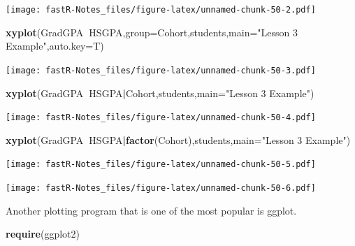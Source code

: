 \documentclass[]{book}
\newenvironment{Shaded}{\begin{snugshade}}{\end{snugshade}}
\newcommand{\KeywordTok}[1]{\textcolor[rgb]{0.13,0.29,0.53}{\textbf{#1}}}
\newcommand{\DataTypeTok}[1]{\textcolor[rgb]{0.13,0.29,0.53}{#1}}
\newcommand{\StringTok}[1]{\textcolor[rgb]{0.31,0.60,0.02}{#1}}
\newcommand{\OperatorTok}[1]{\textcolor[rgb]{0.81,0.36,0.00}{\textbf{#1}}}
\newcommand{\NormalTok}[1]{#1}
\theoremstyle{definition}
\theoremstyle{definition}
\theoremstyle{definition}
\theoremstyle{remark}
\begin{document}
\texttt{[image: fastR-Notes\_files/figure-latex/unnamed-chunk-50-2.pdf]}

\begin{Shaded}
\begin{Highlighting}[]
\KeywordTok{xyplot}\NormalTok{(GradGPA}\OperatorTok{~}\NormalTok{HSGPA,}\DataTypeTok{group=}\NormalTok{Cohort,students,}\DataTypeTok{main=}\StringTok{"Lesson 3 Example"}\NormalTok{,}\DataTypeTok{auto.key=}\NormalTok{T)}
\end{Highlighting}
\end{Shaded}

\texttt{[image: fastR-Notes\_files/figure-latex/unnamed-chunk-50-3.pdf]}

\begin{Shaded}
\begin{Highlighting}[]
\KeywordTok{xyplot}\NormalTok{(GradGPA}\OperatorTok{~}\NormalTok{HSGPA}\OperatorTok{|}\NormalTok{Cohort,students,}\DataTypeTok{main=}\StringTok{"Lesson 3 Example"}\NormalTok{)}
\end{Highlighting}
\end{Shaded}

\texttt{[image: fastR-Notes\_files/figure-latex/unnamed-chunk-50-4.pdf]}

\begin{Shaded}
\begin{Highlighting}[]
\KeywordTok{xyplot}\NormalTok{(GradGPA}\OperatorTok{~}\NormalTok{HSGPA}\OperatorTok{|}\KeywordTok{factor}\NormalTok{(Cohort),students,}\DataTypeTok{main=}\StringTok{"Lesson 3 Example"}\NormalTok{)}
\end{Highlighting}
\end{Shaded}

\texttt{[image: fastR-Notes\_files/figure-latex/unnamed-chunk-50-5.pdf]}

\begin{Shaded}
\end{Shaded}

\texttt{[image: fastR-Notes\_files/figure-latex/unnamed-chunk-50-6.pdf]}

Another plotting program that is one of the most popular is ggplot.

\begin{Shaded}
\begin{Highlighting}[]
\KeywordTok{require}\NormalTok{(ggplot2)}
\end{Highlighting}
\end{Shaded}
\end{document}
